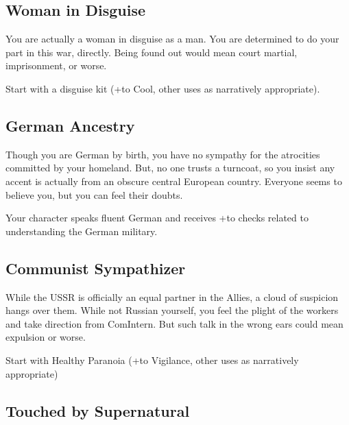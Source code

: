 \documentclass{book}
\newcommand{\bbb}{\BoostDie }
\begin{document}
\begin{multicols}{2}
\subsection{Woman in Disguise}

You are actually a woman in disguise as a man.  You are determined to do your part in this war, directly.  Being found out would mean court martial, imprisonment, or worse.

Start with a disguise kit (+\bbb to Cool, other uses as narratively appropriate).

\subsection{German Ancestry}

Though you are German by birth, you have no sympathy for the atrocities committed by your homeland.  But, no one trusts a turncoat, so you insist any accent is actually from an obscure central European country.  Everyone seems to believe you, but you can feel their doubts.

Your character speaks fluent German and receives +\bbb to checks related to understanding the German military.

\subsection{Communist Sympathizer}

While the USSR is officially an equal partner in the Allies, a cloud of suspicion hangs over them.  While not Russian yourself, you feel the plight of the workers and take direction from ComIntern.  But such talk in the wrong ears could mean expulsion or worse.

Start with Healthy Paranoia (+\bbb to Vigilance, other uses as narratively appropriate)

%
%

\subsection{Touched by Supernatural}


\end{multicols}
\end{document}
